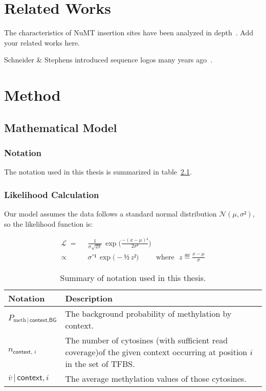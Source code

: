 \documentclass[PhD]{PHlab-thesis}
\begin{document}
\chapter{Related Works}
The characteristics of NuMT insertion sites have been analyzed in depth~\cite{TFH12}.
Add your related works here.

Schneider \& Stephens introduced sequence logos many years ago~\cite{SS90}.



\chapter{Method}
\section{Mathematical Model}
\subsection{Notation}
The notation used in this thesis is summarized in table~\ref{tab:notation}.

\subsection{Likelihood Calculation}
Our model assumes the data follows a standard normal distribution $𝒩(μ,σ²)$, so the likelihood function is:

\begin{align*}
ℒ  \;=&\;\;  \frac{1}{σ\sqrt{2π}}\, \exp\Big( \frac{-(x-μ)²}{2σ²}\Big)\\[.5ex]%
     ∝&\;\;  σ⁻¹\, \exp\big( -½\,z²)  \hspace{1cm} \text{where~~} z ≝ \frac{x-μ}{σ}
\end{align*}



\begin{table}
\begin{tabularx}{0.9\linewidth}{lX}
Notation                                               &  Description\\
\toprule
$P_{\text{meth}\,|\,\textsf{context,BG}}$                    &  The background probability of methylation by context.\\[.3ex]
$n_{\textsf{context},\,i}$                                 &  The number of cytosines (with sufficient read coverage)\newline of the given context occurring at position $i$ in the set of TFBS.\\[.3ex]
$\overline{v}\,|\,\scriptstyle{\textsf{context},i}$  & The average methylation values of those cytosines.\\
\bottomrule
\end{tabularx}
\caption{Summary of notation used in this thesis.}
\label{tab:notation}
\end{table}
\end{document}
